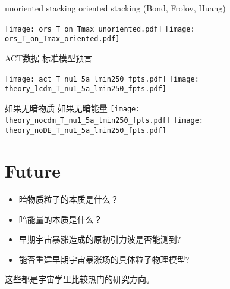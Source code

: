 \documentclass[CJK]{beamer}
\begin{document}
\begin{frame}
  
  {\hskip 0.2in} {\scriptsize unoriented stacking}     {\hskip 0.65in} {\scriptsize oriented stacking (Bond, Frolov, Huang)}
            
  \texttt{[image: ors\_T\_on\_Tmax\_unoriented.pdf]}  
  \texttt{[image: ors\_T\_on\_Tmax\_oriented.pdf]}
\end{frame}


  
  


\begin{frame}
\bch
\hskip 0.2in ACT数据 \hskip 0.6in   标准模型预言

\texttt{[image: act\_T\_nu1\_5a\_lmin250\_fpts.pdf]}
\texttt{[image: theory\_lcdm\_T\_nu1\_5a\_lmin250\_fpts.pdf]}

如果无暗物质 \hskip 0.5in 如果无暗能量
\texttt{[image: theory\_nocdm\_T\_nu1\_5a\_lmin250\_fpts.pdf]}
\texttt{[image: theory\_noDE\_T\_nu1\_5a\_lmin250\_fpts.pdf]}

\ech
\end{frame}

\section{Future}

\begin{frame}
\bch
\begin{itemize}
\item{暗物质粒子的本质是什么？}
\item{暗能量的本质是什么？}
\item{早期宇宙暴涨造成的原初引力波是否能测到?}
\item{能否重建早期宇宙暴涨场的具体粒子物理模型?}
\end{itemize}

这些都是宇宙学里比较热门的研究方向。
\ech
\end{frame}
\end{document}
